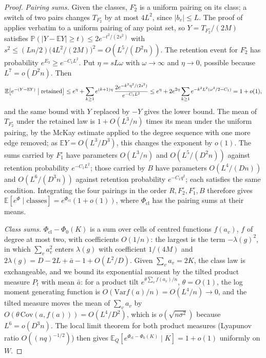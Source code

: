 \documentclass[11pt]{article}
\newcommand{\EE}{\mathbb{E}}
\newcommand{\PP}{\mathbb{P}}
\newcommand{\Var}{\mathrm{Var}}
\begin{document}
\begin{proof}
\emph{Pairing sums.} Given the classes, \(F_2^\circ\) is a uniform pairing
on its class; a switch of two pairs changes \(T_{F_2^\circ}\) by at most
\(4L^2\), since \(\lvert b_v\rvert\le L\). The proof
of~\cite[Theorem~2.19]{Wormald99} applies verbatim to a uniform pairing of
any point set, so \(Y=T_{F_2^\circ}/(2M)\) satisfies
\(\PP(\lvert Y-\EE Y\rvert\ge t)\le2e^{-t^2/(2s^2)}\) with
\(s^2\le(Ln/2)\bigl(4L^2/(2M)\bigr)^2=O(L^5/(D^2n))\). The retention event
for \(F_2^\circ\) has probability \(e^{E_3}\ge e^{-C_1L^2}\). Put
\(\eta=sL\omega\) with \(\omega\to\infty\) and \(\eta\to0\), possible
because \(L^7=o(D^2n)\). Then
\[
\EE\bigl[e^{-(Y-\EE Y)}\bigm|\text{retained}\bigr]
\le e^{\eta}+\sum_{k\ge1}e^{(k+1)\eta}\,
\frac{2e^{-k^2\eta^2/(2s^2)}}{e^{-C_1L^2}}
\le e^{\eta}+2e^{2\eta}\sum_{k\ge1}e^{-k^2L^2(\omega^2/2-C_1)}
=1+o(1),
\]
and the same bound with \(Y\) replaced by \(-Y\) gives the lower bound. The
mean of \(T_{F_2^\circ}\) under the retained law is \(1+O(L^3/n)\) times
its mean under the uniform pairing, by the McKay estimate applied to the
degree sequence with one more edge removed; as \(\EE Y=O(L^3/D^3)\), this
changes the exponent by \(o(1)\). The sums carried by \(F_1^\circ\) have
parameters \(O(L^3/n)\) and \(O(L^5/(D^2n))\) against retention probability
\(e^{-C_1L^2}\); those carried by \(B\) have parameters \(O(L^4/(Dn))\) and
\(O(L^6/(D^3n))\) against retention probability \(e^{-C_1q^2}\); each
satisfies the same condition. Integrating the four pairings in the order
\(R,F_2^\circ,F_1^\circ,B\) therefore gives
\(\EE[e^{\Phi}\mid\text{classes}]=e^{\Phi_{\mathrm{cl}}}(1+o(1))\), where
\(\Phi_{\mathrm{cl}}\) has the pairing sums at their means.

\emph{Class sums.} \(\Phi_{\mathrm{cl}}-\Phi_0(K)\) is a sum over cells of
centred functions \(f(a_v)\), \(f\) of degree at most two, with coefficients
\(O(1/n)\): the largest is the term \(-\lambda(g)^2\), in which
\(\sum_va_v^2\) enters \(\lambda(g)\) with coefficient \(1/(4M)\) and
\(2\lambda(g)=D-2L+\bar a-1+O(L^2/D)\). Given \(\sum_va_v=2K\), the class
law is exchangeable, and we bound its exponential moment by the tilted
product measure \(P_t\) with mean \(\bar a\): for a product tilt
\(e^{\theta\sum_v f(a_v)/n}\), \(\theta=O(1)\), the log moment generating
function is \(O(\Var f(a)/n)=O(L^4/n)\to0\), and the tilted measure moves the
mean of \(\sum_va_v\) by \(O(\theta\,\mathrm{Cov}(a,f(a)))=O(L^4/D^2)\),
which is \(o(\sqrt{n\sigma^2})\) because \(L^6=o(D^3n)\). The local limit
theorem for both product measures (Lyapunov ratio \(O((nq)^{-1/2})\)) then
gives \(\EE_Q[e^{\Phi_{\mathrm{cl}}-\Phi_0(K)}\mid K]=1+o(1)\) uniformly on
\(W\).


\end{proof}
\end{document}
